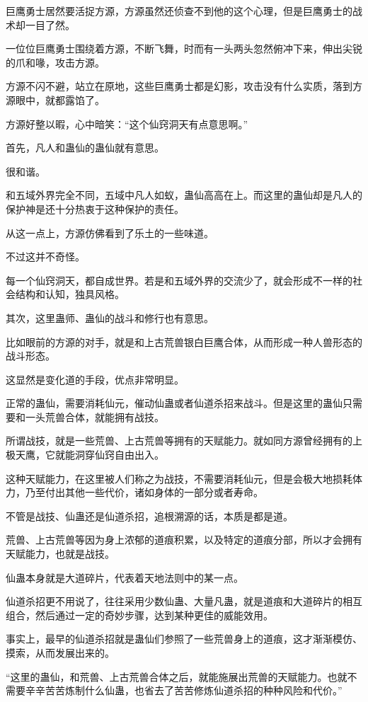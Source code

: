 \begin{this_body}
巨鹰勇士居然要活捉方源，方源虽然还侦查不到他的这个心理，但是巨鹰勇士的战术却一目了然。

一位位巨鹰勇士围绕着方源，不断飞舞，时而有一头两头忽然俯冲下来，伸出尖锐的爪和喙，攻击方源。

方源不闪不避，站立在原地，这些巨鹰勇士都是幻影，攻击没有什么实质，落到方源眼中，就都露馅了。

方源好整以暇，心中暗笑：“这个仙窍洞天有点意思啊。”

首先，凡人和蛊仙的蛊仙就有意思。

很和谐。

和五域外界完全不同，五域中凡人如蚁，蛊仙高高在上。而这里的蛊仙却是凡人的保护神是还十分热衷于这种保护的责任。

从这一点上，方源仿佛看到了乐土的一些味道。

不过这并不奇怪。

每一个仙窍洞天，都自成世界。若是和五域外界的交流少了，就会形成不一样的社会结构和认知，独具风格。

其次，这里蛊师、蛊仙的战斗和修行也有意思。

比如眼前的方源的对手，就是和上古荒兽银白巨鹰合体，从而形成一种人兽形态的战斗形态。

这显然是变化道的手段，优点非常明显。

正常的蛊仙，需要消耗仙元，催动仙蛊或者仙道杀招来战斗。但是这里的蛊仙只需要和一头荒兽合体，就能拥有战技。

所谓战技，就是一些荒兽、上古荒兽等拥有的天赋能力。就如同方源曾经拥有的上极天鹰，它就能洞穿仙窍自由出入。

这种天赋能力，在这里被人们称之为战技，不需要消耗仙元，但是会极大地损耗体力，乃至付出其他一些代价，诸如身体的一部分或者寿命。

不管是战技、仙蛊还是仙道杀招，追根溯源的话，本质是都是道。

荒兽、上古荒兽等因为身上浓郁的道痕积累，以及特定的道痕分部，所以才会拥有天赋能力，也就是战技。

仙蛊本身就是大道碎片，代表着天地法则中的某一点。

仙道杀招更不用说了，往往采用少数仙蛊、大量凡蛊，就是道痕和大道碎片的相互组合，然后通过一定的奇妙步骤，达到某种更佳的威能效用。

事实上，最早的仙道杀招就是蛊仙们参照了一些荒兽身上的道痕，这才渐渐模仿、摸索，从而发展出来的。

“这里的蛊仙，和荒兽、上古荒兽合体之后，就能施展出荒兽的天赋能力。也就不需要辛辛苦苦炼制什么仙蛊，也省去了苦苦修炼仙道杀招的种种风险和代价。”


\end{this_body}
